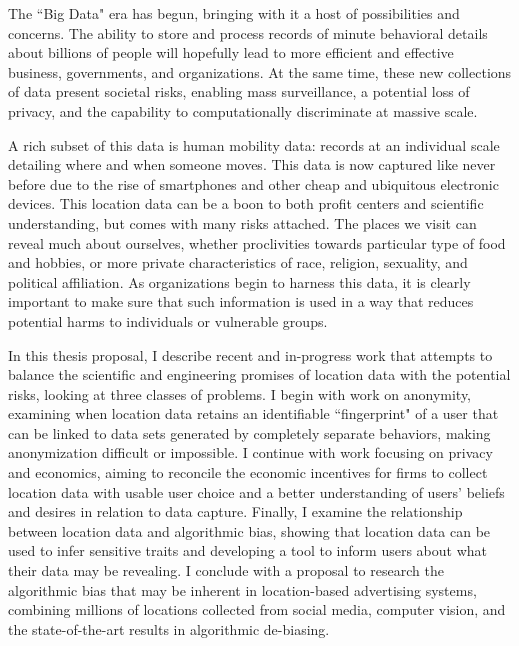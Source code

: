 The ``Big Data" era has begun, bringing with it a host of possibilities and concerns.
The ability to store and process records of minute behavioral details about billions of people will hopefully lead to more efficient and effective business, governments, and organizations.
At the same time, these new collections of data present societal risks, enabling mass surveillance, a potential loss of privacy, and the capability to computationally discriminate at massive scale.

A rich subset of this data is human mobility data: records at an individual scale detailing where and when someone moves.
This data is now captured like never before due to the rise of smartphones and other cheap and ubiquitous electronic devices.
This location data can be a boon to both profit centers and scientific understanding, but comes with many risks attached.
The places we visit can reveal much about ourselves, whether proclivities towards particular type of food and hobbies, or more private characteristics of race, religion, sexuality, and political affiliation.
As organizations begin to harness this data, it is clearly important to make sure that such information is used in a way that reduces potential harms to individuals or vulnerable groups.

In this thesis proposal, I describe recent and in-progress work that attempts to balance the scientific and engineering promises of location data with the potential risks, looking at three classes of problems.
I begin with work on anonymity, examining when location data retains an identifiable ``fingerprint" of a user that can be linked to data sets generated by completely separate behaviors, making anonymization difficult or impossible.
I continue with work focusing on privacy and economics, aiming to reconcile the economic incentives for firms to collect location data with usable user choice and a better understanding of users' beliefs and desires in relation to data capture.
Finally, I examine the relationship between location data and algorithmic bias, showing that location data can be used to infer sensitive traits and developing a tool to inform users about what their data may be revealing.
I conclude with a proposal to research the algorithmic bias that may be inherent in location-based advertising systems, combining millions of locations collected from social media, computer vision, and the state-of-the-art results in algorithmic de-biasing.


